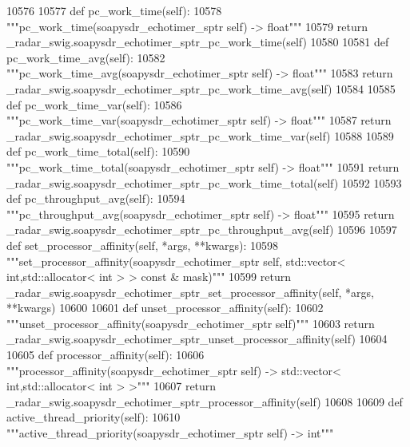 \begin{DoxyCode}
{{{{{{{{{{{{{{{{{{{{{{{{{{{{{{{{{10576 
10577     \textcolor{keyword}{def }pc_work_time(self):
10578         \textcolor{stringliteral}{"""pc\_work\_time(soapysdr\_echotimer\_sptr self) -> float"""}
10579         \textcolor{keywordflow}{return} \_radar\_swig.soapysdr\_echotimer\_sptr\_pc\_work\_time(self)
10580 
10581     \textcolor{keyword}{def }pc_work_time_avg(self):
10582         \textcolor{stringliteral}{"""pc\_work\_time\_avg(soapysdr\_echotimer\_sptr self) -> float"""}
10583         \textcolor{keywordflow}{return} \_radar\_swig.soapysdr\_echotimer\_sptr\_pc\_work\_time\_avg(self)
10584 
10585     \textcolor{keyword}{def }pc_work_time_var(self):
10586         \textcolor{stringliteral}{"""pc\_work\_time\_var(soapysdr\_echotimer\_sptr self) -> float"""}
10587         \textcolor{keywordflow}{return} \_radar\_swig.soapysdr\_echotimer\_sptr\_pc\_work\_time\_var(self)
10588 
10589     \textcolor{keyword}{def }pc_work_time_total(self):
10590         \textcolor{stringliteral}{"""pc\_work\_time\_total(soapysdr\_echotimer\_sptr self) -> float"""}
10591         \textcolor{keywordflow}{return} \_radar\_swig.soapysdr\_echotimer\_sptr\_pc\_work\_time\_total(self)
10592 
10593     \textcolor{keyword}{def }pc_throughput_avg(self):
10594         \textcolor{stringliteral}{"""pc\_throughput\_avg(soapysdr\_echotimer\_sptr self) -> float"""}
10595         \textcolor{keywordflow}{return} \_radar\_swig.soapysdr\_echotimer\_sptr\_pc\_throughput\_avg(self)
10596 
10597     \textcolor{keyword}{def }set_processor_affinity(self, *args, **kwargs):
10598         \textcolor{stringliteral}{"""set\_processor\_affinity(soapysdr\_echotimer\_sptr self, std::vector< int,std::allocator< int > >
       const & mask)"""}
10599         \textcolor{keywordflow}{return} \_radar\_swig.soapysdr\_echotimer\_sptr\_set\_processor\_affinity(self, *args, **kwargs)
10600 
10601     \textcolor{keyword}{def }unset_processor_affinity(self):
10602         \textcolor{stringliteral}{"""unset\_processor\_affinity(soapysdr\_echotimer\_sptr self)"""}
10603         \textcolor{keywordflow}{return} \_radar\_swig.soapysdr\_echotimer\_sptr\_unset\_processor\_affinity(self)
10604 
10605     \textcolor{keyword}{def }processor_affinity(self):
10606         \textcolor{stringliteral}{"""processor\_affinity(soapysdr\_echotimer\_sptr self) -> std::vector< int,std::allocator< int > >"""}
10607         \textcolor{keywordflow}{return} \_radar\_swig.soapysdr\_echotimer\_sptr\_processor\_affinity(self)
10608 
10609     \textcolor{keyword}{def }active_thread_priority(self):
10610         \textcolor{stringliteral}{"""active\_thread\_priority(soapysdr\_echotimer\_sptr self) -> int"""}
}}}}}}}}}}}}}}}}}}}}}}}}}}}}}}}}}
\end{DoxyCode}

